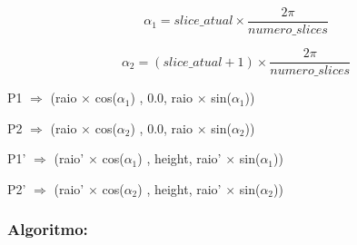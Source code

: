\documentclass[a4paper]{article}
\begin{document}

\ttfamily
$$\alpha_{1} = slice\_atual \times \frac{2\pi}{numero\_slices} $$

\vspace{0.5cm}

$$\alpha_{2} = (slice\_atual+1) \times \frac{2\pi}{numero\_slices} $$

\vspace{0.5cm}

        \hspace{1.5cm} P1 $\Rightarrow$ (raio $\times$ cos($\alpha_{1}$) , 0.0, raio $\times$ sin($\alpha_{1}$))

\vspace{0.2cm}

        \hspace{1.5cm} P2 $\Rightarrow$ (raio $\times$ cos($\alpha_{2}$) , 0.0, raio $\times$ sin($\alpha_{2}$))

\vspace{0.2cm}

        \hspace{1cm} P1' $\Rightarrow$ (raio' $\times$ cos($\alpha_{1}$) , height, raio' $\times$ sin($\alpha_{1}$))

\vspace{0.2cm}

        \hspace{1cm} P2' $\Rightarrow$ (raio' $\times$ cos($\alpha_{2}$) , height, raio' $\times$ sin($\alpha_{2}$))

\rmfamily

\newpage

\subsubsection{Algoritmo:}
\end{document}
